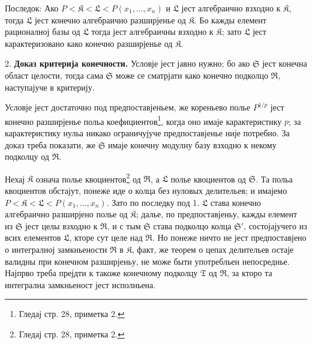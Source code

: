 ﻿\documentclass[11pt]{article}
\begin{document}
Последок: Ако $P<\mathfrak K<\mathfrak L<P(x_1,\ldots,x_n)$ и $\mathfrak L$ јест алгебраично взходно к $\mathfrak K$, тогда $\mathfrak L$ јест конечно алгебраично разширјенье од $\mathfrak K$. Бо кажды елемент рационалној базы од $\mathfrak L$ тогда јест алгебраичны взходно к $\mathfrak K$; зато $\mathfrak L$ јест карактеризовано како конечно разширјенье од $\mathfrak K$.

2. \textbf{Доказ критерија конечности.} Условје јест јавно нужно; бо ако $\mathfrak S$ јест конечна област целости, тогда сама $\mathfrak S$ може се сматрјати како конечно подколцо $\mathfrak R$, наступајуче в критерију.

Условје јест достаточно под предпоставјеньем, же кореньево полье $P^{1/p}$ јест конечно разширјенье польа коефициентов\footnote{Гледај стр. 28, приметка 2.}, когда оно имаје карактеристику $p$; за карактеристику нульа никако ограничујуче предпоставјенье није потребно. За доказ треба показати, же $\mathfrak S$ имаје конечну модулну базу взходно к некому подколцу од $\mathfrak R$.

Нехај $\mathfrak K$ означа полье квоциентов\footnote{Гледај стр. 28, приметка 2.} од $\mathfrak R$, а $\mathfrak L$ полье квоциентов од $\mathfrak S$. Та польа квоциентов обстајут, понеже иде о колца без нуловых делительев; и имајемо $P<\mathfrak K<\mathfrak L<P(x_1,\ldots,x_n)$. Зато по последку под 1. $\mathfrak L$ става конечно алгебраично разширјено полье од $\mathfrak K$; далье, по предпоставјеньу, кажды елемент из $\mathfrak S$ јест целы взходно к $\mathfrak R$, и с тым $\mathfrak S$ става подколцо колца $\mathfrak S'$, состојајучего из всих елементов $\mathfrak L$, кторе сут целе над $\mathfrak R$. Но понеже ничто не јест предпоставјено о интегралној замкньености $\mathfrak R$ в $\mathfrak K$, факт, же теорем о цепах делительев остаје валидны при конечном разширјеньу, не може быти употребльен непосреднье. Најпрво треба прејдти к такоже конечному подколцу $\mathfrak T$ од $\mathfrak R$, за кторо та интегрална замкньеност јест исполньена.
\end{document}
